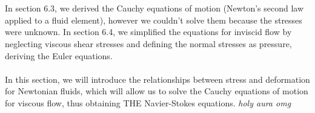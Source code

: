 ﻿\documentclass[12pt]{article}
\begin{document}
\section*{}
In section 6.3, we derived the Cauchy equations of motion (Newton's second law applied to a fluid element), however we couldn't solve them because the stresses were unknown. In section 6.4, we simplified the equations for inviscid flow by neglecting viscous shear stresses and defining the normal stresses as pressure, deriving the Euler equations.\\\\
In this section, we will introduce the relationships between stress and deformation for Newtonian fluids, which will allow us to solve the Cauchy equations of motion for viscous flow, thus obtaining THE Navier-Stokes equations. \textit{holy aura omg}
\end{document}
